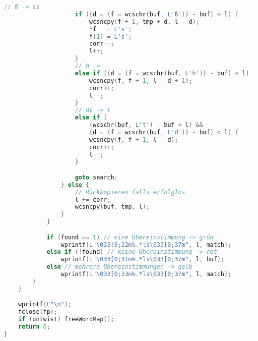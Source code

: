 \documentclass[a4paper,10pt,ngerman]{scrartcl}
\begin{document}
\begin{lstlisting}[language=C++]
                    // ß -> ss
                    if ((d = (f = wcschr(buf, L'ß')) - buf) < l) {
                        wcsncpy(f + 1, tmp + d, l - d);
                        *f   = L's';
                        f[1] = L's';
                        corr--;
                        l++;
                    }
                    // h ->
                    else if ((d = (f = wcschr(buf, L'h')) - buf) < l) {
                        wcsncpy(f, f + 1, l - d + 1);
                        corr++;
                        l--;
                    }
                    // dt -> t
                    else if (
                        (wcschr(buf, L't') - buf < l) &&
                        (d = (f = wcschr(buf, L'd')) - buf) < l) {
                        wcsncpy(f, f + 1, l - d);
                        corr++;
                        l--;
                    }

                    goto search;
                } else {
                    // Rückkopieren falls erfolglos
                    l += corr;
                    wcsncpy(buf, tmp, l);
                }
            }

            if (found == 1) // eine Übereinstimmung -> grün
                wprintf(L"\033[0;32m%.*ls\033[0;37m", l, match);
            else if (!found) // keine Übereinstimmung -> rot
                wprintf(L"\033[0;31m%.*ls\033[0;37m", l, buf);
            else // mehrere Übereinstimmungen -> gelb
                wprintf(L"\033[0;33m%.*ls\033[0;37m", l, match);
        }
    }

    wprintf(L"\n");
    fclose(fp);
    if (untwist) freeWordMap();
    return 0;
}


\end{lstlisting}
\end{document}
